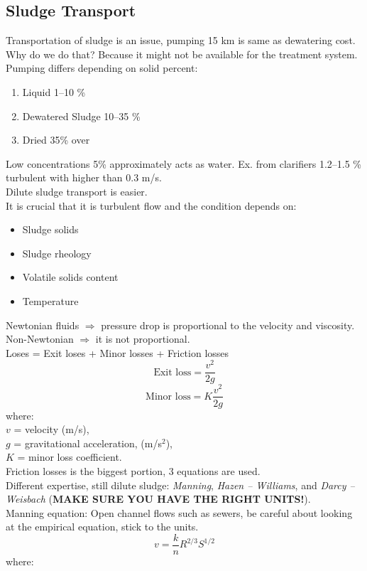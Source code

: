 \documentclass{article}
\numberwithin{equation}{section}
\begin{document}
\subsection{Sludge Transport}
Transportation of sludge is an issue, pumping 15 km is same as dewatering cost.\\
Why do we do that? Because it might not be available for the treatment system.\\
Pumping differs depending on solid percent:
\begin{enumerate}
    \item Liquid 1--10 \%
    \item Dewatered Sludge 10--35 \%
    \item Dried 35\% over
\end{enumerate}
Low concentrations 5\% approximately acts as water. Ex. from clarifiers 1.2--1.5 \% turbulent with higher than 0.3 m/s.\\
Dilute sludge transport is easier.\\
It is crucial that it is turbulent flow and the condition depends on:
\begin{itemize}
    \item Sludge solids
    \item Sludge rheology
    \item Volatile solids content
    \item Temperature
\end{itemize}
Newtonian fluids $\Rightarrow$ pressure drop is proportional to the velocity and viscosity.\\
Non-Newtonian $\Rightarrow$ it is not proportional.\\
Loses = Exit loses + Minor losses + Friction losses
\[
\text{Exit loss} = \frac{v^2}{2g}
\]
\[
\text{Minor loss} = K\frac{v^2}{2g}
\]
where:\\
$v$ = velocity (m/s),\\
$g$ = gravitational acceleration, (m/s$^2$),\\
$K$ = minor loss coefficient.\\
Friction losses is the biggest portion, 3 equations are used.\\
Different expertise, still dilute sludge: \emph{Manning}, \emph{Hazen -- Williams}, and \emph{Darcy -- Weisbach} (\textbf{MAKE SURE YOU HAVE THE RIGHT UNITS!}).\\
Manning equation: Open channel flows such as sewers, be careful about looking at the empirical equation, stick to the units.
\[
v = \frac{k}{n}R^{2/3}S^{1/2}
\]
where:\\
\end{document}
